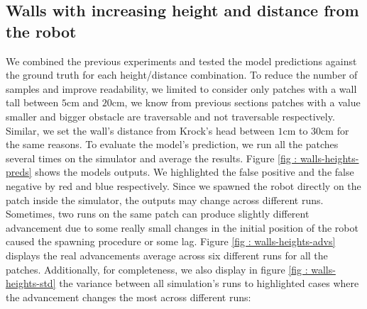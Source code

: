 \subsection{Walls with increasing height and distance from the robot}
We combined the previous experiments and tested the model predictions against the ground truth for each height/distance combination. To reduce the number of samples and improve readability, we limited to consider only patches with a wall tall between $5$cm and $20$cm, we know from previous sections patches with a value smaller and bigger obstacle are traversable and not traversable respectively. Similar, we set the wall's distance from Krock's head between $1$cm to $30$cm for the same reasons. To evaluate the model's prediction, we run all the patches several times on the simulator and average the results. Figure \ref{fig :  walls-heights-preds} shows the models outputs. We highlighted the false positive and the false negative by red and blue respectively.  Since we spawned the robot directly on the patch inside the simulator, the outputs may change across different runs. Sometimes, two runs on the same patch can produce slightly different advancement due to some really small changes in the initial position of the robot caused the spawning procedure or some lag. Figure \ref{fig : walls-heights-advs} displays the real advancements average across six different runs for all the patches. Additionally, for completeness, we also display in figure \ref{fig : walls-heights-std} the variance between all simulation's runs to highlighted cases where the advancement changes the most across different runs:  

